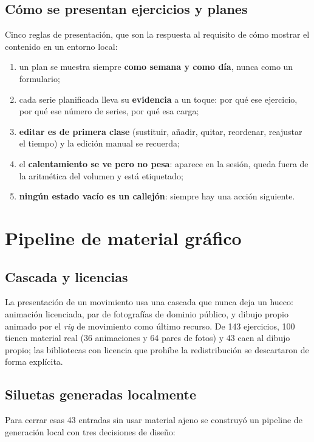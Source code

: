 \documentclass[conference]{IEEEtran}
\begin{document}
\subsection{C\'omo se presentan ejercicios y planes}\label{sec:plans}
Cinco reglas de presentaci\'on, que son la respuesta al requisito de c\'omo
mostrar el contenido en un entorno local:
\begin{enumerate}
  \item un plan se muestra siempre \textbf{como semana y como d\'ia}, nunca como
  un formulario;
  \item cada serie planificada lleva su \textbf{evidencia} a un toque: por qu\'e
  ese ejercicio, por qu\'e ese n\'umero de series, por qu\'e esa carga;
  \item \textbf{editar es de primera clase} (sustituir, a\~nadir, quitar,
  reordenar, reajustar el tiempo) y la edici\'on manual se recuerda;
  \item el \textbf{calentamiento se ve pero no pesa}: aparece en la sesi\'on,
  queda fuera de la aritm\'etica del volumen y est\'a etiquetado;
  \item \textbf{ning\'un estado vac\'io es un callej\'on}: siempre hay una
  acci\'on siguiente.
\end{enumerate}

\section{Pipeline de material gr\'afico}

\subsection{Cascada y licencias}
La presentaci\'on de un movimiento usa una cascada que nunca deja un hueco:
animaci\'on licenciada, par de fotograf\'ias de dominio p\'ublico, y dibujo
propio animado por el \emph{rig} de movimiento como \'ultimo recurso. De 143
ejercicios, 100 tienen material real (36 animaciones y 64 pares de fotos) y 43
caen al dibujo propio; las bibliotecas con licencia que proh\'ibe la
redistribuci\'on se descartaron de forma expl\'icita.

\subsection{Siluetas generadas localmente}
Para cerrar esas 43 entradas sin usar material ajeno se construy\'o un pipeline
de generaci\'on local con tres decisiones de dise\~no:
\end{document}
